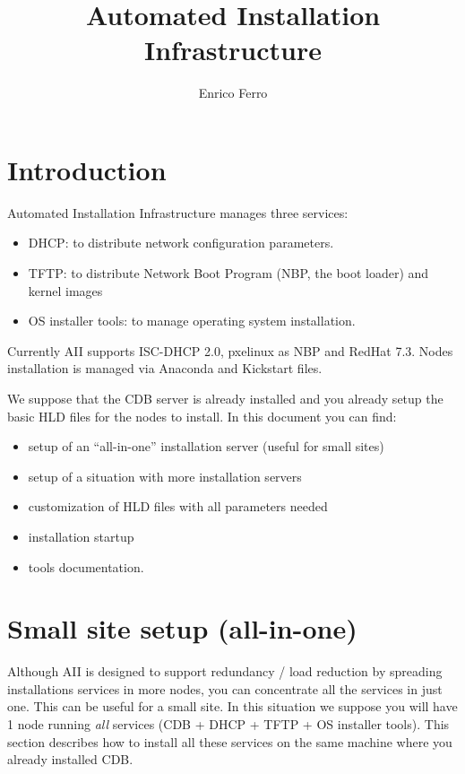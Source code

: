 \documentclass{datagridreport}
\title{Automated Installation Infrastructure}
\author{Enrico Ferro \Email{enrico.ferro@pd.infn.it}}
\begin{document}
\chapter{Introduction}
Automated Installation Infrastructure manages three services:
\begin{itemize}
 \item DHCP: to distribute network configuration parameters.
 \item TFTP: to distribute Network Boot Program (NBP, the boot loader) and kernel
       images
 \item OS installer tools: to manage operating system installation.
\end{itemize}
Currently AII supports ISC-DHCP 2.0, pxelinux as NBP and RedHat 7.3.  Nodes
installation is managed via Anaconda and Kickstart files.

We suppose that the CDB server is already installed and you already setup the basic
HLD files for the nodes to install. In this document you can find:
\begin{itemize}
\item setup of an ``all-in-one'' installation server (useful for
small sites)
\item setup of a situation with more installation servers
\item customization of HLD files with all parameters needed
\item installation startup
\item tools documentation.
\end{itemize}


\chapter{Small site setup (all-in-one)} \label{allinone}
Although AII is designed to support redundancy / load reduction by spreading
installations services in more nodes, you can concentrate all the services in just
one. This can be useful for a small site. In this situation we suppose you will
have 1 node running \emph{all} services (CDB + DHCP + TFTP + OS installer tools).
This section describes how to install all these services on the same
machine where you already installed CDB.
\end{document}
